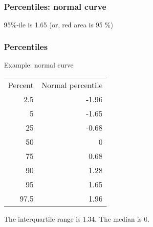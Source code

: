 \documentclass[handout]{beamer}
\begin{document}


   \begin{frame}
   \frametitle{Percentiles: normal curve}
   \begin{center}
   \end{center}
   95\%-ile is 1.65 (or, {\color{red} red area is 95 \%})
   \end{frame}


   \begin{frame} \frametitle{Percentiles}

   \begin{block}
   {Example: normal curve}

   \begin{tabular}{rr}
   Percent & Normal percentile \\
   2.5 & -1.96 \\
   5 &  -1.65 \\
   25 & -0.68 \\
   50 & 0 \\
   75 & 0.68 \\
   90 & 1.28 \\
   95 & 1.65 \\
   97.5 & 1.96 \\
   \end{tabular}

   The interquartile range is 1.34. The median is 0.

   \end{block}
   \end{frame}

\end{document}
